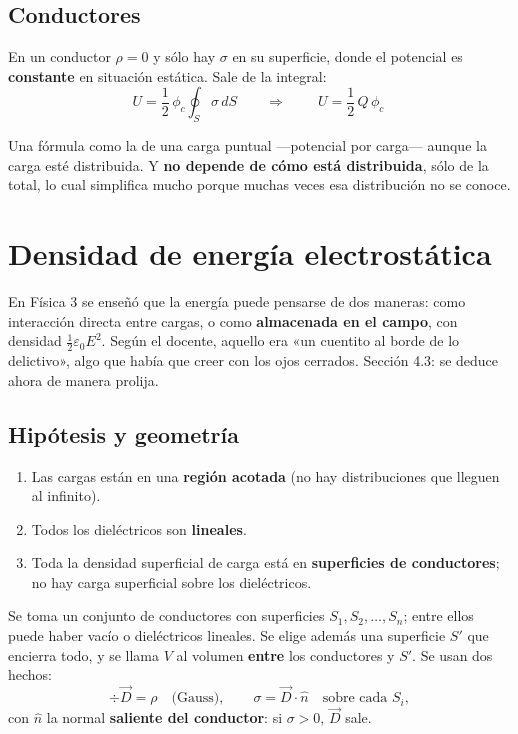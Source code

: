 \documentclass[12pt,a4paper]{article}
\begin{document}
\subsection{Conductores}
\label{sec:conductores}

En un conductor $\rho = 0$ y sólo hay $\sigma$ en su superficie, donde el
potencial es \textbf{constante} en situación estática. Sale de la integral:
\[
U = \frac12\,\phi_c\oint_S\sigma\,dS
\qquad\Longrightarrow\qquad
\boxed{\ U = \frac12\,Q\,\phi_c\ }
\]

\begin{notebox}
Una fórmula como la de una carga puntual ---potencial por carga--- aunque la
carga esté distribuida. Y \textbf{no depende de cómo está distribuida}, sólo de
la total, lo cual simplifica mucho porque muchas veces esa distribución no se
conoce.
\end{notebox}

\section{Densidad de energía electrostática}

En Física 3 se enseñó que la energía puede pensarse de dos maneras: como
interacción directa entre cargas, o como \textbf{almacenada en el campo}, con
densidad $\tfrac12\varepsilon_0 E^2$. Según el docente, aquello era «un cuentito
al borde de lo delictivo», algo que había que creer con los ojos cerrados.
Sección 4.3: se deduce ahora de manera prolija.

\subsection{Hipótesis y geometría}

\begin{enumerate}
  \item Las cargas están en una \textbf{región acotada} (no hay distribuciones que
    lleguen al infinito).
  \item Todos los dieléctricos son \textbf{lineales}.
  \item Toda la densidad superficial de carga está en \textbf{superficies de
    conductores}; no hay carga superficial sobre los dieléctricos.
\end{enumerate}

Se toma un conjunto de conductores con superficies $S_1, S_2, \dots, S_n$; entre
ellos puede haber vacío o dieléctricos lineales. Se elige además una superficie
$S'$ que encierra todo, y se llama $V$ al volumen \textbf{entre} los conductores y
$S'$. Se usan dos hechos:
\[
\div\vec D = \rho \quad\text{(Gauss)},
\qquad
\sigma = \vec D\cdot\hat n \quad\text{sobre cada } S_i ,
\]
con $\hat n$ la normal \textbf{saliente del conductor}: si $\sigma>0$, $\vec D$
sale.
\end{document}
